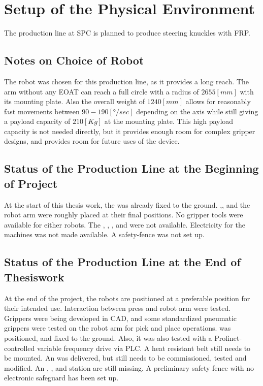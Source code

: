 \chapter{Setup of the Physical Environment}
The production line at \ac{SPC} is planned to produce steering knuckles with \ac{FRP}.



\section{Notes on Choice of Robot} %
The robot was chosen for this production line, as it provides a long reach. The arm without any \ac{EOAT} can reach a full circle with a radius of $2655 [\textit{mm}]$ with its mounting plate. Also the overall weight of $1240 [\textit{mm}]$ allows for reasonably fast movements between $90-190 [\textit{°/sec}] $ depending on the axis while still giving a payload capacity of $210 [\textit{Kg}]$ at the mounting plate.\cite{210FDatasheet}
This high payload capacity is not needed directly, but it provides enough room for complex gripper designs, and provides room for future uses of the device.

\section{Status of the Production Line at the Beginning of Project}
At the start of this thesis work, the  was already fixed to the ground. 
,, and the robot arm were roughly placed at their final positions.
No gripper tools were available for either robots.
The , , ,  and  were not available.
Electricity for the machines was not made available.
A safety-fence was not set up.

\section{Status of the Production Line at the End of Thesiswork}
At the end of the project, the robots are positioned at a preferable position for their intended use. Interaction between press and robot arm were tested. Grippers were being developed in \ac{CAD}, and some standardized pneumatic grippers were tested on the robot arm for pick and place operations.  was positioned, and fixed to the ground. Also, it was also tested with a Profinet-controlled variable frequency drive via \ac{PLC}. A heat resistant belt still needs to be mounted. An  was delivered, but still needs to be commissioned, tested and modified. 
An , ,  and  station are still missing.
A preliminary safety fence with no electronic safeguard has been set up. 


